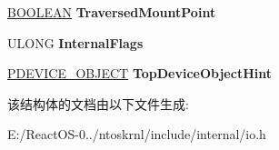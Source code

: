 \begin{DoxyCompactItemize}
\hyperlink{_processor_bind_8h_a112e3146cb38b6ee95e64d85842e380a}{B\+O\+O\+L\+E\+AN} {\bfseries Traversed\+Mount\+Point}
\item 
\mbox{\label{struct___o_p_e_n___p_a_c_k_e_t_a9f73b3643e02d8ddfda362bd5ffa4bd4}} 
U\+L\+O\+NG {\bfseries Internal\+Flags}
\item 
\mbox{\label{struct___o_p_e_n___p_a_c_k_e_t_aae8267f419c6c982d486fc2b44c58b7c}} 
\hyperlink{struct___d_e_v_i_c_e___o_b_j_e_c_t}{P\+D\+E\+V\+I\+C\+E\+\_\+\+O\+B\+J\+E\+CT} {\bfseries Top\+Device\+Object\+Hint}
\end{DoxyCompactItemize}


该结构体的文档由以下文件生成\+:\begin{DoxyCompactItemize}
\item 
E\+:/\+React\+O\+S-\/0../ntoskrnl/include/internal/io.\+h\end{DoxyCompactItemize}
